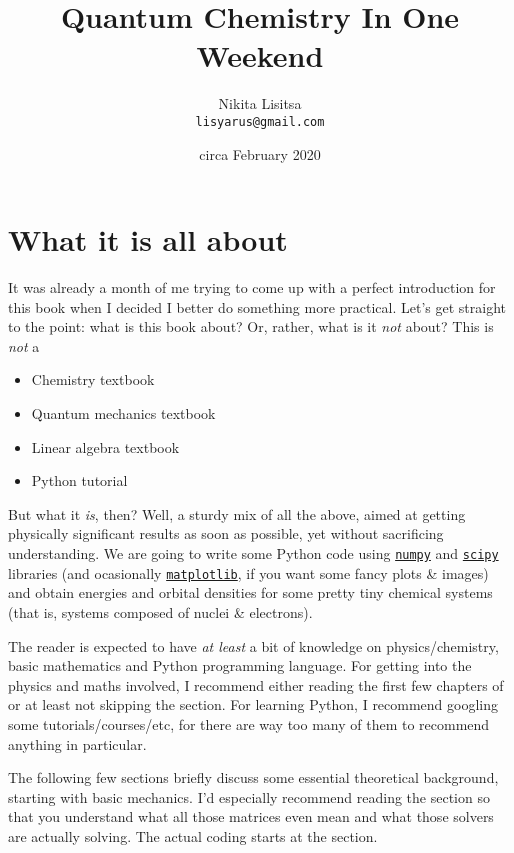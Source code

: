 \documentclass{article}
\title{Quantum Chemistry In One Weekend}
\author{Nikita Lisitsa \\ \texttt{lisyarus@gmail.com}}
\date{circa February 2020}
\begin{document}
\maketitle
\newpage

\tableofcontents
\newpage

\section{What it is all about}

It was already a month of me trying to come up with a perfect introduction for this book when I decided I better do something more practical. Let's get straight to the point: what is this book about? Or, rather, what is it \textit{not} about? This is \textit{not} a

\begin{itemize}
\item Chemistry textbook
\item Quantum mechanics textbook
\item Linear algebra textbook
\item Python tutorial
\end{itemize}

But what it \textit{is}, then? Well, a sturdy mix of all the above, aimed at getting physically significant results as soon as possible, yet without sacrificing understanding. We are going to write some Python code using \href{https://numpy.org}{\texttt{numpy}} and \href{https://www.scipy.org}{\texttt{scipy}} libraries (and ocasionally \href{https://matplotlib.org}{\texttt{matplotlib}}, if you want some fancy plots \& images) and obtain energies and orbital densities for some pretty tiny chemical systems (that is, systems composed of nuclei \& electrons).

The reader is expected to have \textit{at least} a bit of knowledge on physics/chemistry, basic mathematics and Python programming language. For getting into the physics and maths involved, I recommend either reading the first few chapters of \cite{ref:atkins} or at least not skipping the  section. For learning Python, I recommend googling some tutorials/courses/etc, for there are way too many of them to recommend anything in particular.

The following few sections briefly discuss some essential theoretical background, starting with basic mechanics. I'd especially recommend reading the  section so that you understand what all those matrices even mean and what those solvers are actually solving. The actual coding starts at the  section.
\end{document}
